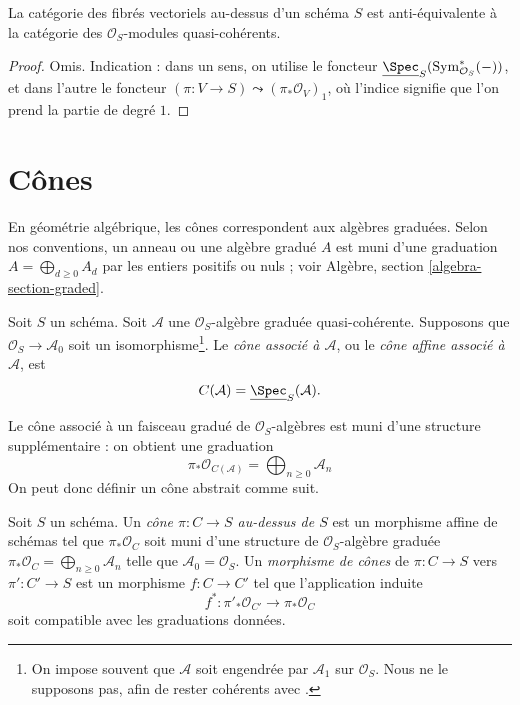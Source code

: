 \begin{lemma}
\label{lemma-category-vector-bundles}
La catégorie des fibrés vectoriels au-dessus d'un schéma $S$ est
anti-équivalente à la catégorie des $\mathcal{O}_S$-modules quasi-cohérents.
\end{lemma}

\begin{proof}
Omis. Indication : dans un sens, on utilise le foncteur
$\underline{\Spec}_S(\text{Sym}^*_{\mathcal{O}_S}(-))$,
et dans l'autre le foncteur
$(\pi : V \to S) \leadsto (\pi_*\mathcal{O}_V)_1$, où l'indice
signifie que l'on prend la partie de degré $1$.
\end{proof}




\section{Cônes}
\label{section-cone}

\noindent
En géométrie algébrique, les cônes correspondent aux algèbres graduées.
Selon nos conventions, un anneau ou une algèbre gradué $A$ est muni d'une graduation
$A = \bigoplus_{d \geq 0} A_d$ par les entiers positifs ou nuls ; voir
Algèbre, section \ref{algebra-section-graded}.

\begin{definition}
\label{definition-cone}
Soit $S$ un schéma. Soit $\mathcal{A}$ une
$\mathcal{O}_S$-algèbre graduée quasi-cohérente. Supposons que
$\mathcal{O}_S \to \mathcal{A}_0$ soit un isomorphisme\footnote{On impose
souvent que $\mathcal{A}$ soit engendrée par $\mathcal{A}_1$ sur
$\mathcal{O}_S$. Nous ne le supposons pas, afin de rester cohérents avec
\cite[II, (8.3.1)]{EGA}.}.
Le {\it cône associé à $\mathcal{A}$}, ou le
{\it cône affine associé à $\mathcal{A}$}, est
$$
C(\mathcal{A}) = \underline{\Spec}_S(\mathcal{A}).
$$
\end{definition}

\noindent
Le cône associé à un faisceau gradué de $\mathcal{O}_S$-algèbres
est muni d'une structure supplémentaire : on obtient une graduation
$$
\pi_*\mathcal{O}_{C(\mathcal{A})} =
\bigoplus\nolimits_{n \geq 0} \mathcal{A}_n
$$
On peut donc définir un cône abstrait comme suit.

\begin{definition}
\label{definition-abstract-cone}
Soit $S$ un schéma. Un {\it cône $\pi : C \to S$ au-dessus de $S$} est un
morphisme affine de schémas tel que $\pi_*\mathcal{O}_C$ soit muni d'une
structure de $\mathcal{O}_S$-algèbre graduée
$\pi_*\mathcal{O}_C = \bigoplus\nolimits_{n \geq 0} \mathcal{A}_n$
telle que $\mathcal{A}_0 = \mathcal{O}_S$. Un {\it morphisme de cônes}
de $\pi : C \to S$ vers $\pi' : C' \to S$
est un morphisme $f : C \to C'$ tel que l'application induite
$$
f^* : \pi'_*\mathcal{O}_{C'} \longrightarrow \pi_*\mathcal{O}_C
$$
soit compatible avec les graduations données.
\end{definition}

